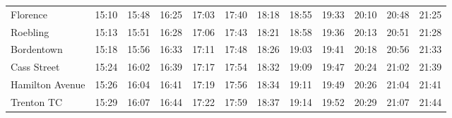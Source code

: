 \begin{center}
\begin{tabular}{@{}lrrrrrrrrrrr@{}}
Florence & 15:10 & 15:48 & 16:25 & 17:03 & 17:40 & 18:18 & 18:55 & 19:33 & 20:10 & 20:48 & 21:25 \\
Roebling & 15:13 & 15:51 & 16:28 & 17:06 & 17:43 & 18:21 & 18:58 & 19:36 & 20:13 & 20:51 & 21:28 \\
Bordentown & 15:18 & 15:56 & 16:33 & 17:11 & 17:48 & 18:26 & 19:03 & 19:41 & 20:18 & 20:56 & 21:33 \\
Cass Street & 15:24 & 16:02 & 16:39 & 17:17 & 17:54 & 18:32 & 19:09 & 19:47 & 20:24 & 21:02 & 21:39 \\
Hamilton Avenue & 15:26 & 16:04 & 16:41 & 17:19 & 17:56 & 18:34 & 19:11 & 19:49 & 20:26 & 21:04 & 21:41 \\
Trenton TC & 15:29 & 16:07 & 16:44 & 17:22 & 17:59 & 18:37 & 19:14 & 19:52 & 20:29 & 21:07 & 21:44 \\
\bottomrule\end{tabular}\end{center}
